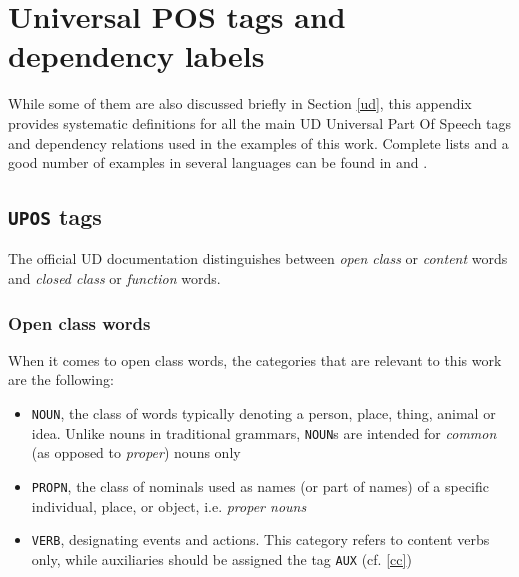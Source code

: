 \chapter{Universal POS tags and dependency labels} \label{a}
While some of them are also discussed briefly in Section \ref{ud}, this appendix provides systematic definitions for all the main UD Universal Part Of Speech tags and dependency relations used in the examples of this work. Complete lists and a good number of examples in several languages can be found in \cite{uddocs} and \cite{compsyn}.

\section{\texttt{UPOS} tags} \label{a_pos}
The official UD documentation \cite{uddocs} distinguishes between \textit{open class} or \textit{content} words and \textit{closed class} or \textit{function} words. 

\subsection{Open class words}
When it comes to open class words, the categories that are relevant to this work are the following:\smallskip
\begin{itemize}
    \item \texttt{NOUN}, the class of words typically denoting a person, place, thing, animal or idea. Unlike nouns in traditional grammars, \texttt{NOUN}s are intended for \textit{common} (as opposed to \textit{proper}) nouns only
    \item \texttt{PROPN}, the class of nominals used as names (or part of names) of a specific individual, place, or object, i.e. \textit{proper nouns}
    \item \texttt{VERB}, designating events and actions. This category refers to content verbs only, while auxiliaries should be assigned the tag \texttt{AUX} (cf. \ref{cc})
\end{itemize}


